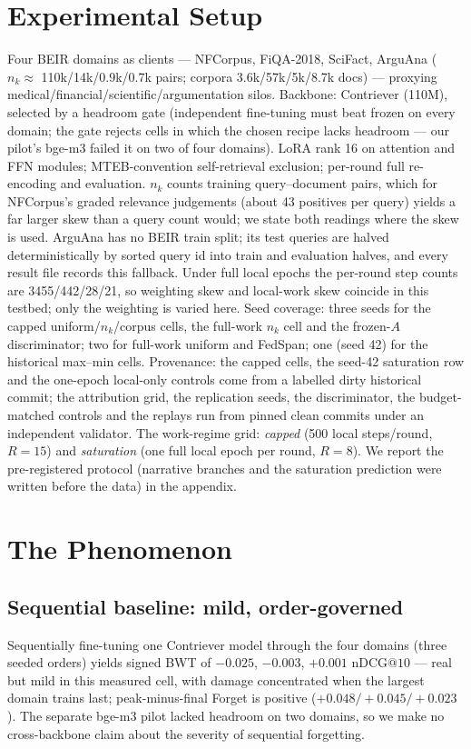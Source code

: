 \documentclass[sigconf,anonymous,review]{acmart}
\makeatletter
\newcommand{\ndcg}{\mathrm{nDCG@10}}
\makeatother
\begin{document}
\section{Experimental Setup}\label{sec:setup}
Four BEIR domains as clients --- NFCorpus, FiQA-2018, SciFact, ArguAna ($n_k \approx$ 110k/14k/0.9k/0.7k pairs; corpora 3.6k/57k/5k/8.7k docs) --- proxying medical/financial/scientific/argumentation silos. Backbone: Contriever (110M), selected by a headroom gate (independent fine-tuning must beat frozen on every domain; the gate rejects cells in which the chosen recipe lacks headroom --- our pilot's bge-m3 failed it on two of four domains). LoRA rank 16 on attention and FFN modules; MTEB-convention self-retrieval exclusion; per-round full re-encoding and evaluation. $n_k$ counts training query--document pairs, which for NFCorpus's graded relevance judgements (about 43 positives per query) yields a far larger skew than a query count would; we state both readings where the skew is used. ArguAna has no BEIR train split; its test queries are halved deterministically by sorted query id into train and evaluation halves, and every result file records this fallback. Under full local epochs the per-round step counts are 3455/442/28/21, so weighting skew and local-work skew coincide in this testbed; only the weighting is varied here. Seed coverage: three seeds for the capped uniform/$n_k$/corpus cells, the full-work $n_k$ cell and the frozen-$A$ discriminator; two for full-work uniform and FedSpan; one (seed 42) for the historical max--min cells. Provenance: the capped cells, the seed-42 saturation row and the one-epoch local-only controls come from a labelled dirty historical commit; the attribution grid, the replication seeds, the discriminator, the budget-matched controls and the replays run from pinned clean commits under an independent validator. The work-regime grid: \emph{capped} (500 local steps/round, $R{=}15$) and \emph{saturation} (one full local epoch per round, $R{=}8$). We report the pre-registered protocol (narrative branches and the saturation prediction were written before the data) in the appendix.

\section{The Phenomenon}\label{sec:phenomenon}
\subsection{Sequential baseline: mild, order-governed}
Sequentially fine-tuning one Contriever model through the four domains (three seeded orders) yields signed BWT of $-0.025$, $-0.003$, $+0.001$ $\ndcg$ --- real but mild in this measured cell, with damage concentrated when the largest domain trains last; peak-minus-final Forget is positive ($+0.048/+0.045/+0.023$). The separate bge-m3 pilot lacked headroom on two domains, so we make no cross-backbone claim about the severity of sequential forgetting.
\end{document}
